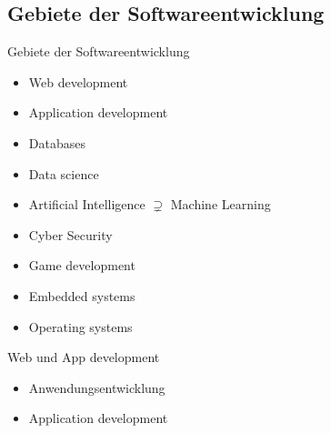 \subsection{Gebiete der Softwareentwicklung}

\begin{frame}{Gebiete der Softwareentwicklung}
    \begin{itemize}
        \item Web development
        \item Application development
        \item Databases
        \item Data science
        \item Artificial Intelligence $\supsetneq$ Machine Learning
        \item Cyber Security
        \item Game development
        \item Embedded systems
        \item Operating systems
    \end{itemize}

\end{frame}

\begin{frame}{Web und App development}
    \begin{itemize}
        \item Anwendungsentwicklung
        \item Application development
    \end{itemize}

    \note{

    }
\end{frame}